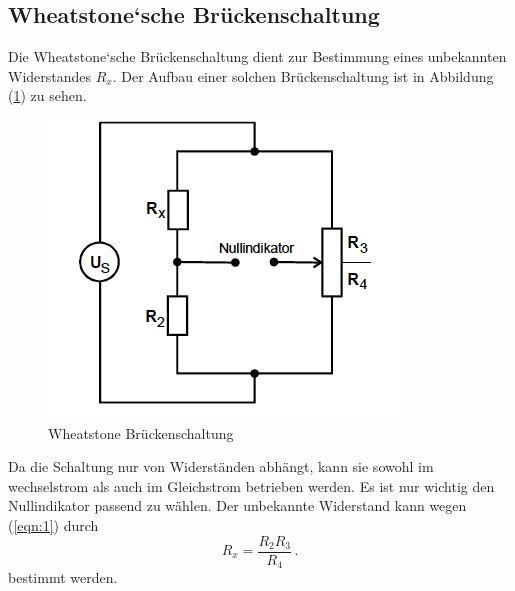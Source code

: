 \subsection{Wheatstone`sche Brückenschaltung}
Die Wheatstone`sche Brückenschaltung dient zur Bestimmung eines unbekannten Widerstandes $R_x$.
Der Aufbau einer solchen Brückenschaltung ist in Abbildung (\ref{fig:whe}) zu sehen.
\begin{figure}
  \centering
  \includegraphics[scale = 0.7]{Wheat.PNG}
  \caption{Wheatstone Brückenschaltung\protect\cite{on3}}
  \label{fig:whe}
\end{figure}
Da die Schaltung nur von Widerständen abhängt,
kann sie sowohl im wechselstrom als auch im Gleichstrom betrieben werden.
Es ist nur wichtig den Nullindikator passend zu wählen.
Der unbekannte Widerstand kann wegen (\ref{eqn:1}) durch
\begin{equation}
  R_x = \frac{R_2R_3}{R_4}\, .
\end{equation}
bestimmt werden.

